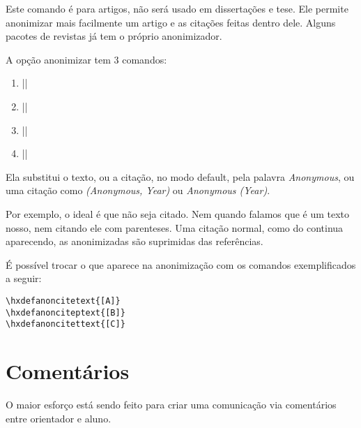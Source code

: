 \documentclass{article}
\begin{document}
    Este comando é para artigos, não será usado em dissertações e tese. Ele permite anonimizar mais facilmente um artigo e as citações feitas dentro dele. Alguns pacotes de revistas já tem o próprio anonimizador.
    
    A opção anonimizar tem 3 comandos:
    \begin{enumerate}
        \item ||
        \item ||
        \item ||
        \item ||
    \end{enumerate}
    
    Ela substitui o texto, ou a citação, no modo default, pela palavra \textit{Anonymous}, ou uma citação como \textit{(Anonymous, Year)} ou \textit{Anonymous (Year)}.
    
    Por exemplo, o ideal é que  não seja citado. Nem quando falamos que  é um texto nosso, nem citando ele com parenteses. Uma citação normal, como do \citet{Juran2010} continua aparecendo, as anonimizadas são suprimidas das referências.
    
    É possível trocar o que aparece na anonimização com os comandos exemplificados a seguir:
    \begin{verbatim}
\hxdefanoncitetext{[A]}
\hxdefanonciteptext{[B]}
\hxdefanoncitettext{[C]}
    \end{verbatim}
    
    \section{Comentários}
 \label{sec:com}   
    O maior esforço está sendo feito para criar uma comunicação via comentários entre orientador e aluno.
    
\end{document}
